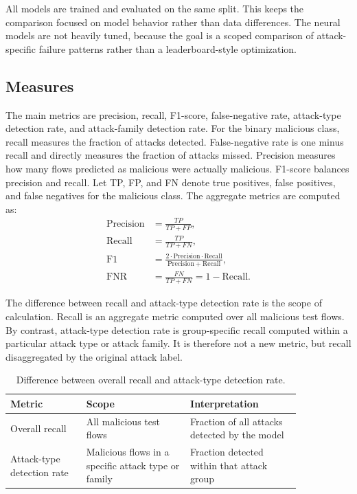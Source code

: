\documentclass[sigconf,nonacm]{acmart}
\begin{document}
All models are trained and evaluated on the same split.
This keeps the comparison focused on model behavior rather than data differences.
The neural models are not heavily tuned, because the goal is a scoped comparison of attack-specific failure patterns rather than a leaderboard-style optimization.

\subsection{Measures}

The main metrics are precision, recall, F1-score, false-negative rate, attack-type detection rate, and attack-family detection rate.
For the binary malicious class, recall measures the fraction of attacks detected.
False-negative rate is one minus recall and directly measures the fraction of attacks missed.
Precision measures how many flows predicted as malicious were actually malicious.
F1-score balances precision and recall.
Let TP, FP, and FN denote true positives, false positives, and false negatives for the malicious class.
The aggregate metrics are computed as:
\begin{equation}
\begin{aligned}
\mathrm{Precision} &= \frac{TP}{TP + FP}, \\
\mathrm{Recall} &= \frac{TP}{TP + FN}, \\
\mathrm{F1} &= \frac{2 \cdot \mathrm{Precision} \cdot \mathrm{Recall}}
{\mathrm{Precision} + \mathrm{Recall}}, \\
\mathrm{FNR} &= \frac{FN}{TP + FN} = 1 - \mathrm{Recall}.
\end{aligned}
\end{equation}

The difference between recall and attack-type detection rate is the scope of calculation.
Recall is an aggregate metric computed over all malicious test flows.
By contrast, attack-type detection rate is group-specific recall computed within a particular attack type or attack family.
It is therefore not a new metric, but recall disaggregated by the original attack label.

\begin{table}[t]
  \caption{Difference between overall recall and attack-type detection rate.}
  \label{tab:recall_definition}
  \centering
  \small
  \begin{tabular}{@{}p{0.22\linewidth}p{0.30\linewidth}p{0.32\linewidth}@{}}
    \toprule
    Metric & Scope & Interpretation \\
    \midrule
    Overall recall & All malicious test flows & Fraction of all attacks detected by the model \\
    Attack-type detection rate & Malicious flows in a specific attack type or family & Fraction detected within that attack group \\
    \bottomrule
  \end{tabular}
\end{table}
\end{document}
